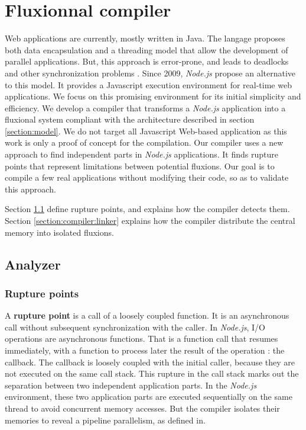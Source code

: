 \section{Fluxionnal compiler} \label{section:compiler}

Web applications are currently, mostly written in Java.
The langage proposes both data encapsulation and a threading model that allow the development of parallel applications.
But, this approach is error-prone, and leads to deadlocks and other synchronization problems \cite{Adya2002}.
Since 2009, \textit{Node.js}\cite{Dahl} propose an alternative to this model.
It provides a Javascript execution environment for real-time web applications.
We focus on this promising environment for its initial simplicity and efficiency.
We develop a compiler that transforms a \textit{Node.js} application into a fluxional system compliant with the architecture described in section \ref{section:model}.
We do not target all Javascript Web-based application as this work is only a proof of concept for the compilation.
Our compiler uses a new approach to find independent parts in \textit{Node.js} applications.
It finds rupture points that represent limitations between potential fluxions.
Our goal is to compile a few real applications without modifying their code, so as to validate this approach.

Section \ref{section:compiler:analyzer} define rupture points, and explains how the compiler detects them.
Section \ref{section:compiler:linker} explains how the compiler distribute the central memory into isolated fluxions.

\subsection{Analyzer} \label{section:compiler:analyzer}

\subsubsection{Rupture points} \label{section:compiler:analyzer:rupture}

A \textbf{rupture point} is a call of a loosely coupled function.
It is an asynchronous call without subsequent synchronization with the caller.
In \textit{Node.js}, I/O operations are asynchronous functions.
That is a function call that resumes immediately, with a function to process later the result of the operation : the callback.
The callback is loosely coupled with the initial caller, because they are not executed on the same call stack.
This rupture in the call stack marks out the separation between two independent application parts.
In the \textit{Node.js} environment, these two application parts are executed sequentially on the same thread to avoid concurrent memory accesses.
But the compiler isolates their memories to reveal a pipeline parallelism, as defined in\cite{Gordon2006}.

